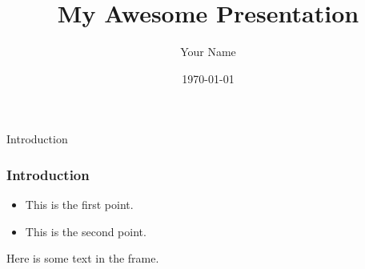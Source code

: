 \documentclass{beamer}
\title{My Awesome Presentation}
\author{Your Name}
\date{\today}
\institute{Your Institution}
\begin{document}
\begin{frame}
    \titlepage
\end{frame}


\begin{frame}{Introduction}
    \frametitle{Introduction} %

    \begin{itemize}
        \item This is the first point.
        \item This is the second point.
    \end{itemize}

    Here is some text in the frame.
\end{frame}

\end{document}
